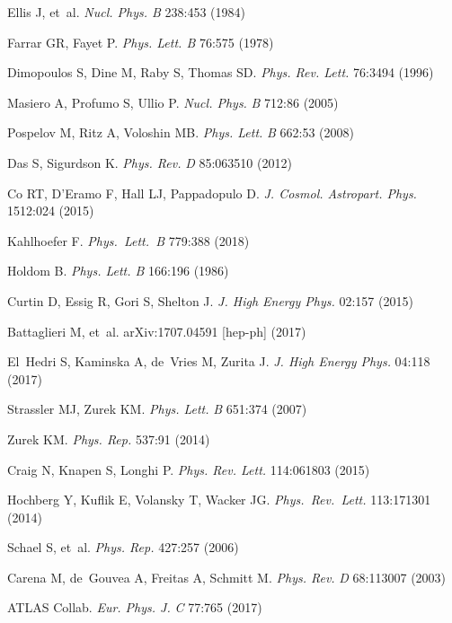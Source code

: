 \documentclass{ar-1col}
\begin{document}
{\begin{thebibliography}{175}
{Ellis} J, et~al. \textit{Nucl. Phys. B} 238:453 (1984)

Farrar GR, Fayet P. \textit{Phys. Lett. B} 76:575 (1978)

Dimopoulos S, Dine M, Raby S, Thomas SD. \textit{Phys. Rev. Lett.}
76:3494 (1996)

Masiero A, Profumo S, Ullio P. \textit{Nucl. Phys.} \textit{B} 712:86 (2005)

Pospelov M, Ritz A, Voloshin MB. \textit{Phys. Lett.} \textit{B} 662:53
(2008)

Das S, Sigurdson K. \textit{Phys. Rev.} \textit{D} 85:063510 (2012)

Co RT, D'Eramo F, Hall LJ, Pappadopulo D. \textit{J. Cosmol. Astropart. Phys.} 1512:024
(2015)

  Kahlhoefer F. \textit{Phys.\ Lett.\ B }{779}:388 (2018)

Holdom B. \textit{Phys. Lett. B} 166:196 (1986)

Curtin D, Essig R, Gori S, Shelton J. \textit{J. High Energy Phys.} 02:157 (2015)

Battaglieri M, et~al. arXiv:1707.04591 [hep-ph] (2017)

El~Hedri S, Kaminska A, de~Vries M, Zurita J. \textit{J. High Energy Phys.} 04:118
(2017)

Strassler MJ, Zurek KM. \textit{Phys. Lett.} \textit{B} 651:374 (2007)

Zurek KM. \textit{Phys. Rep.} 537:91 (2014)

Craig N, Knapen S, Longhi P. \textit{Phys. Rev. Lett.} 114:061803
(2015)

  Hochberg Y, Kuflik E, Volansky T, Wacker JG.  \textit{Phys.\ Rev.\ Lett.}  {113}:171301 (2014)


Schael S, et~al. \textit{Phys. Rep.} 427:257 (2006)

Carena M, de~Gouvea A, Freitas A, Schmitt M. \textit{Phys. Rev.}
\textit{D} 68:113007 (2003)

{ATLAS Collab.} \textit{Eur. Phys. J.} \textit{C} 77:765 (2017)



\end{thebibliography}}
\end{document}
